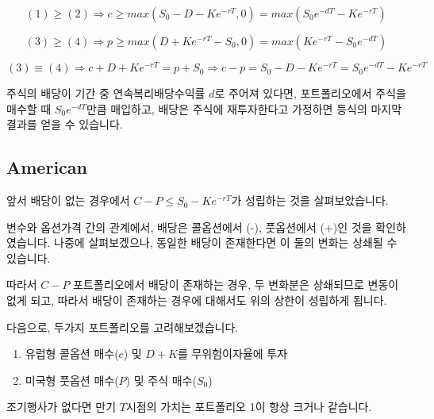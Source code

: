 \documentclass[
  letterpaper,
  DIV=11,
  numbers=noendperiod]{scrreprt}
\providecommand{\tightlist}{%
  \setlength{\itemsep}{0pt}\setlength{\parskip}{0pt}}\usepackage{longtable,booktabs,array}
\begin{document}
\[(1)\geq (2)\Rightarrow c\geq max(S_0-D-Ke^{-rT},0)=max(S_0e^{-dT}-Ke^{-rT})\]

\[(3)\geq (4)\Rightarrow p\geq max(D+Ke^{-rT}-S_0,0)=max(Ke^{-rT}-S_0e^{-dT})\]

\[(3)\equiv(4)\Rightarrow c+D+Ke^{-rT}=p+S_0\Rightarrow c-p=S_0-D-Ke^{-rT}=S_0e^{-dT}-Ke^{-rT}\]

\begin{tcolorbox}[enhanced jigsaw, toprule=.15mm, breakable, left=2mm, leftrule=.75mm, opacitybacktitle=0.6, coltitle=black, rightrule=.15mm, colback=white, titlerule=0mm, bottomtitle=1mm, colframe=quarto-callout-tip-color-frame, title=\textcolor{quarto-callout-tip-color}{\faLightbulb}\hspace{0.5em}{Tip}, toptitle=1mm, arc=.35mm, colbacktitle=quarto-callout-tip-color!10!white, opacityback=0, bottomrule=.15mm]

주식의 배당이 기간 중 연속복리배당수익률 \(d\)로 주어져 있다면,
포트폴리오에서 주식을 매수할 때 \(S_0e^{-dT}\)만큼 매입하고, 배당은
주식에 재투자한다고 가정하면 등식의 마지막 결과를 얻을 수 있습니다.

\end{tcolorbox}

\subsection*{American}\label{american-1}

앞서 배당이 없는 경우에서 \(C-P\leq S_0-Ke^{-rT}\)가 성립하는 것을
살펴보았습니다.

변수와 옵션가격 간의 관계에서, 배당은 콜옵션에서 (-), 풋옵션에서 (+)인
것을 확인하였습니다. 나중에 살펴보겠으나, 동일한 배당이 존재한다면 이
둘의 변화는 상쇄될 수 있습니다.

따라서 \(C-P\) 포트폴리오에서 배당이 존재하는 경우, 두 변화분은
상쇄되므로 변동이 없게 되고, 따라서 배당이 존재하는 경우에 대해서도 위의
상한이 성립하게 됩니다.

다음으로, 두가지 포트폴리오를 고려해보겠습니다.

\begin{enumerate}
\def\labelenumi{\arabic{enumi}.}
\tightlist
\item
  유럽형 콜옵션 매수(\(c\)) 및 \(D+K\)를 무위험이자율에 투자
\item
  미국형 풋옵션 매수(\(P\)) 및 주식 매수(\(S_0\))
\end{enumerate}

조기행사가 없다면 만기 \(T\)시점의 가치는 포트폴리오 1이 항상 크거나
같습니다.
\end{document}
